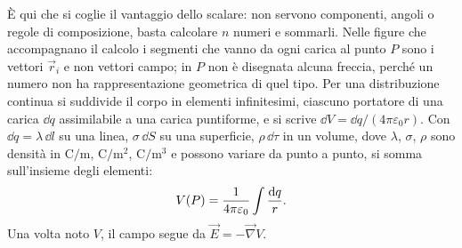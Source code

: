 \documentclass[11pt,a4paper]{article}
\begin{document}
È qui che si coglie il vantaggio dello scalare: non servono componenti, angoli o regole di composizione, basta calcolare $n$ numeri e sommarli. Nelle figure che accompagnano il calcolo i segmenti che vanno da ogni carica al punto $P$ sono i vettori $\vec r_i$ e non vettori campo; in $P$ non è disegnata alcuna freccia, perché un numero non ha rappresentazione geometrica di quel tipo. Per una distribuzione continua si suddivide il corpo in elementi infinitesimi, ciascuno portatore di una carica $\dd q$ assimilabile a una carica puntiforme, e si scrive $\dd V=\dd q/(4\pi\varepsilon_0 r)$. Con $\dd q=\lambda\,\dd l$ su una linea, $\sigma\,\dd S$ su una superficie, $\rho\,\dd\tau$ in un volume, dove $\lambda$, $\sigma$, $\rho$ sono densità in $\ensuremath{\mathrm{C/m}}$, $\ensuremath{\mathrm{C/m^2}}$, $\ensuremath{\mathrm{C/m^3}}$ e possono variare da punto a punto, si somma sull'insieme degli elementi:
\[
V(P)=\frac{1}{4\pi\varepsilon_0}\int\frac{\mathrm{d} q}{r}.
\]
Una volta noto $V$, il campo segue da $\vec E=-\vec \nabla V$.

\end{document}
